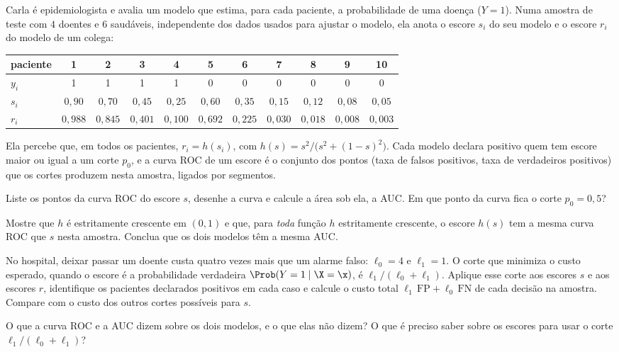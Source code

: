 Carla é epidemiologista e avalia um modelo que estima, para cada paciente, a probabilidade
de uma doença ($Y=1$). Numa amostra de teste com $4$ doentes e $6$ saudáveis, independente
dos dados usados para ajustar o modelo, ela anota o escore $s_i$ do seu modelo e o escore
$r_i$ do modelo de um colega:
\begin{center}\small
\renewcommand{\arraystretch}{1.2}
\begin{tabular}{@{}lcccccccccc@{}}
\toprule
paciente & 1 & 2 & 3 & 4 & 5 & 6 & 7 & 8 & 9 & 10 \\
\midrule
$y_i$ & 1 & 1 & 1 & 1 & 0 & 0 & 0 & 0 & 0 & 0 \\
$s_i$ & $0{,}90$ & $0{,}70$ & $0{,}45$ & $0{,}25$ & $0{,}60$ & $0{,}35$ & $0{,}15$ & $0{,}12$ & $0{,}08$ & $0{,}05$ \\
$r_i$ & $0{,}988$ & $0{,}845$ & $0{,}401$ & $0{,}100$ & $0{,}692$ & $0{,}225$ & $0{,}030$ & $0{,}018$ & $0{,}008$ & $0{,}003$ \\
\bottomrule
\end{tabular}
\end{center}
Ela percebe que, em todos os pacientes, $r_i=h(s_i)$, com $h(s)=s^2/\big(s^2+(1-s)^2\big)$.
Cada modelo declara positivo quem tem escore maior ou igual a um corte $p_0$, e a curva ROC
de um escore é o conjunto dos pontos (taxa de falsos positivos, taxa de verdadeiros
positivos) que os cortes produzem nesta amostra, ligados por segmentos.
\begin{itens}
  \item {} Liste os pontos da curva ROC do escore $s$, desenhe a curva e calcule a
        área sob ela, a AUC. Em que ponto da curva fica o corte $p_0=0{,}5$?
  \item {} Mostre que $h$ é estritamente crescente em $(0,1)$ e que, para
        \emph{toda} função $h$ estritamente crescente, o escore $h(s)$ tem a mesma curva
        ROC que $s$ nesta amostra. Conclua que os dois modelos têm a mesma AUC.
  \item {} No hospital, deixar passar um doente custa quatro vezes mais que um
        alarme falso: $\ell_0=4$ e $\ell_1=1$. O corte que minimiza o custo esperado, quando
        o escore é a probabilidade verdadeira $\Prob(Y=1\mid\X=\x)$, é
        $\ell_1/(\ell_0+\ell_1)$. Aplique esse corte aos escores $s$ e aos escores $r$,
        identifique os pacientes declarados positivos em cada caso e calcule o custo total
        $\ell_1\,\mathrm{FP}+\ell_0\,\mathrm{FN}$ de cada decisão na amostra. Compare com o
        custo dos outros cortes possíveis para $s$.
  \item {} O que a curva ROC e a AUC dizem sobre os dois modelos, e o que elas não
        dizem? O que é preciso saber sobre os escores para usar o corte
        $\ell_1/(\ell_0+\ell_1)$?
\end{itens}

